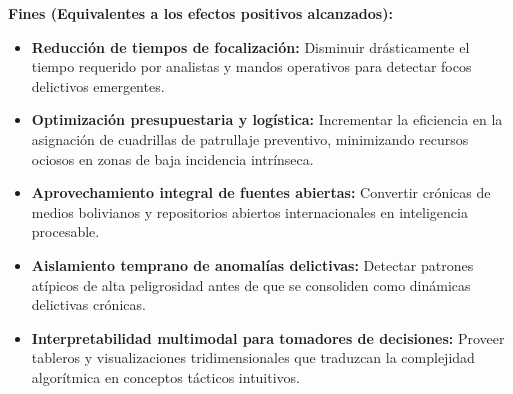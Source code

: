 \textbf{Fines (Equivalentes a los efectos positivos alcanzados):}
\begin{itemize}
    \item \textbf{Reducción de tiempos de focalización:} Disminuir drásticamente el tiempo requerido por analistas y mandos operativos para detectar focos delictivos emergentes.
    \item \textbf{Optimización presupuestaria y logística:} Incrementar la eficiencia en la asignación de cuadrillas de patrullaje preventivo, minimizando recursos ociosos en zonas de baja incidencia intrínseca.
    \item \textbf{Aprovechamiento integral de fuentes abiertas:} Convertir crónicas de medios bolivianos y repositorios abiertos internacionales en inteligencia procesable.
    \item \textbf{Aislamiento temprano de anomalías delictivas:} Detectar patrones atípicos de alta peligrosidad antes de que se consoliden como dinámicas delictivas crónicas.
    \item \textbf{Interpretabilidad multimodal para tomadores de decisiones:} Proveer tableros y visualizaciones tridimensionales que traduzcan la complejidad algorítmica en conceptos tácticos intuitivos.
\end{itemize}

